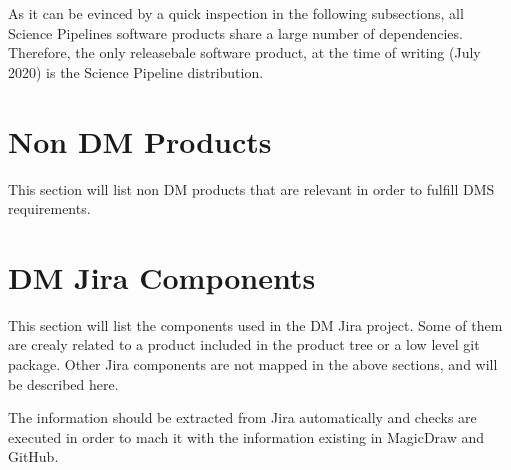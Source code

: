 As it can be evinced by a quick inspection in the following subsections, 
all Science Pipelines software products share a large number of dependencies. 
Therefore, the only releasebale software product, at the time of writing (July 2020) 
is the Science Pipeline distribution.




\newpage
\section{Non DM Products}\label{sec:nondm}

This section will list non DM products that are relevant in order to fulfill DMS requirements.


\newpage
\section{DM Jira Components}\label{sec:jiracomponents}

This section will list the components used in the DM Jira project.
Some of them are crealy related to a product included in the product tree or a low level git package.
Other Jira components are not mapped in the above sections, and will be described here.

The information should be extracted from Jira automatically and checks are executed in order to mach it with the information existing in MagicDraw and GitHub.
